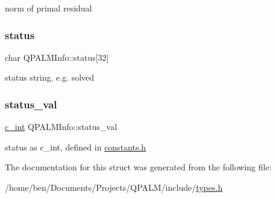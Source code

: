 norm of primal residual 

\mbox{\label{structQPALMInfo_a50d560141016d6b0a0198feb84c4a835}} 
\subsubsection{\texorpdfstring{status}{status}}
{\footnotesize\ttfamily char Q\+P\+A\+L\+M\+Info\+::status\mbox{[}32\mbox{]}}



status string, e.\+g. \textquotesingle{}solved\textquotesingle{} 

\mbox{\label{structQPALMInfo_a8e754dd1c46f6b40ea54fb7422764522}} 
\subsubsection{\texorpdfstring{status\_val}{status\_val}}
{\footnotesize\ttfamily \mbox{\hyperlink{global__opts_8h_aa3217a0f49d3e52b74e9dd830c44472f}{c\+\_\+int}} Q\+P\+A\+L\+M\+Info\+::status\+\_\+val}



status as c\+\_\+int, defined in \mbox{\hyperlink{constants_8h}{constants.\+h}} 



The documentation for this struct was generated from the following file\+:\begin{DoxyCompactItemize}
\item 
/home/ben/\+Documents/\+Projects/\+Q\+P\+A\+L\+M/include/\mbox{\hyperlink{types_8h}{types.\+h}}\end{DoxyCompactItemize}
